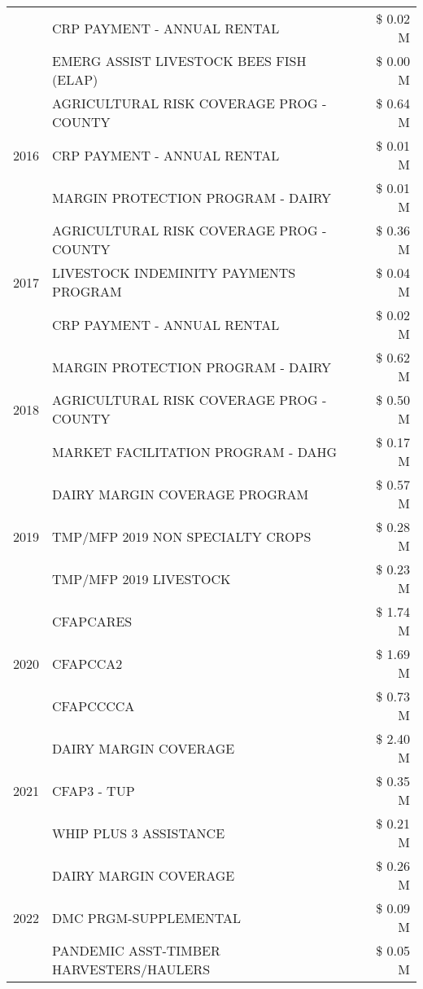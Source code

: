 \begin{tabular}{llr}
 & CRP PAYMENT - ANNUAL RENTAL & \$ 0.02 M \\
 & EMERG ASSIST LIVESTOCK BEES FISH (ELAP) & \$ 0.00 M \\
\cline{1-3}
\multirow[t]{3}{*}{2016} & AGRICULTURAL RISK COVERAGE PROG - COUNTY & \$ 0.64 M \\
 & CRP PAYMENT - ANNUAL RENTAL & \$ 0.01 M \\
 & MARGIN PROTECTION PROGRAM - DAIRY & \$ 0.01 M \\
\cline{1-3}
\multirow[t]{3}{*}{2017} & AGRICULTURAL RISK COVERAGE PROG - COUNTY & \$ 0.36 M \\
 & LIVESTOCK INDEMINITY PAYMENTS PROGRAM & \$ 0.04 M \\
 & CRP PAYMENT - ANNUAL RENTAL & \$ 0.02 M \\
\cline{1-3}
\multirow[t]{3}{*}{2018} & MARGIN PROTECTION PROGRAM - DAIRY & \$ 0.62 M \\
 & AGRICULTURAL RISK COVERAGE PROG - COUNTY & \$ 0.50 M \\
 & MARKET FACILITATION PROGRAM - DAHG & \$ 0.17 M \\
\cline{1-3}
\multirow[t]{3}{*}{2019} & DAIRY MARGIN COVERAGE PROGRAM & \$ 0.57 M \\
 & TMP/MFP 2019 NON SPECIALTY CROPS & \$ 0.28 M \\
 & TMP/MFP 2019 LIVESTOCK & \$ 0.23 M \\
\cline{1-3}
\multirow[t]{3}{*}{2020} & CFAPCARES & \$ 1.74 M \\
 & CFAPCCA2 & \$ 1.69 M \\
 & CFAPCCCCA & \$ 0.73 M \\
\cline{1-3}
\multirow[t]{3}{*}{2021} & DAIRY MARGIN COVERAGE & \$ 2.40 M \\
 & CFAP3 - TUP & \$ 0.35 M \\
 & WHIP PLUS 3 ASSISTANCE & \$ 0.21 M \\
\cline{1-3}
\multirow[t]{3}{*}{2022} & DAIRY MARGIN COVERAGE & \$ 0.26 M \\
 & DMC PRGM-SUPPLEMENTAL & \$ 0.09 M \\
 & PANDEMIC ASST-TIMBER HARVESTERS/HAULERS & \$ 0.05 M \\
\cline{1-3}
\bottomrule
\end{tabular}
